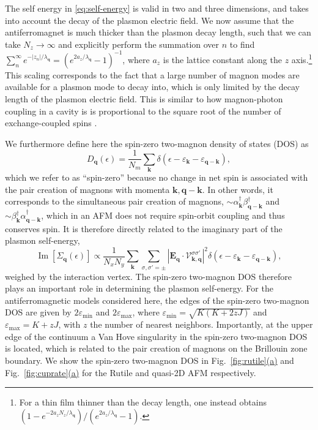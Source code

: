 \documentclass[aps,prb,reprint,twocolumns,superscriptaddress,nofootinbib]{revtex4-2}
\renewcommand{\Im}{\operatorname{Im}}
\newcommand{\subfigref}[2]{Fig.~\hyperref[#1]{\ref*{#1}#2}}
\begin{document}
	The self energy in \cref{eq:self-energy} is valid in two and three dimensions, and takes into account the decay of the plasmon electric field. We now assume that the antiferromagnet is much thicker than the plasmon decay length, such that we can take $N_z\rightarrow\infty$ and explicitly  perform the summation over $n$ to find $\sum_n^{\infty}e^{- |z_n|/\lambda_{\bm q}}=(e^{2a_z/\lambda_{\bm q}}-1)^{-1}$, where $a_z$ is the lattice constant along the $z$ axis.\footnote{For a thin film thinner than the decay length, one instead obtains $(1-e^{-2a_zN_z/\lambda_{\bm q}})/(e^{2a_z/\lambda_{\bm q}}-1)$. } This scaling corresponds to the fact that a large number of magnon modes are available for a plasmon mode to decay into, which is only limited by the decay length of the plasmon electric field. This is similar to how magnon-photon coupling in a cavity is is proportional to the square root of the number of exchange-coupled spins \cite{hueblHighCooperativityCoupled2013}.
	
	
	We furthermore define here the spin-zero two-magnon density of states (DOS) as  
	\begin{equation}
		D_{\bm q}(\epsilon)= \frac{1}{N_m}\sum_{\bm k} \delta({\epsilon -\varepsilon_{\bm k} - \varepsilon_{\bm q-\bm k}}) \label{eq:2DOS},
	\end{equation}
	which we refer to as ``spin-zero'' because no change in net spin is associated with the pair creation of magnons with momenta $\bm k,\bm q-\bm k$. In other words, it corresponds to the simultaneous pair creation of magnons, $\sim\alpha_{\bm k}^\dagger\beta_{\bm q-\bm k}^\dagger $ and $\sim\beta_{\bm k}^\dagger\alpha_{\bm q-\bm k}^\dagger $, which in an AFM does not require spin-orbit coupling and thus conserves spin. It is therefore directly related to the imaginary part of the plasmon self-energy,
	\begin{equation}
		\Im[\Sigma_{\bm q}(\epsilon)] \propto \frac{1}{N_x N_y}\sum_{\bm k}\sum_{\sigma,\sigma'=\pm} {|\bm E_{\bm q}\cdot\bm{\mathcal V}_{\bm k,\bm q}^{\sigma\sigma'}|^2}\delta({\epsilon -\varepsilon_{\bm k} - \varepsilon_{\bm q-\bm k}}),
	\end{equation}
	weighed by the interaction vertex.  
	The spin-zero two-magnon DOS therefore plays an important role in       determining the plasmon self-energy. For the antiferromagnetic models considered here, the edges of the spin-zero two-magnon DOS are given by $2\varepsilon_{\mathrm{min}}$ and $2\varepsilon_{\mathrm{max}}$, where $\varepsilon_{\mathrm{min}}=\sqrt{K(K+2zJ)}$ and $\varepsilon_\mathrm{max}=K+zJ$, with $z$ the number of nearest neighbors. Importantly, at the upper edge of the continuum a Van Hove singularity in the spin-zero two-magnon DOS is located, which is related to the pair creation of magnons on the Brillouin zone boundary. We show the spin-zero two-magnon DOS in \subfigref{fig:rutile}{(a)} and \subfigref{fig:cuprate}{(a)} for the Rutile and quasi-2D AFM respectively.
	
\end{document}

